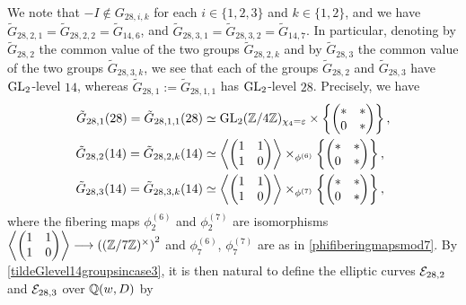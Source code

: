 We note that $-I \notin G_{28,i,k}$ for each $i \in \{1, 2, 3 \}$ and $k \in \{ 1, 2 \}$, and we have $\tilde{G}_{28,2,1} = \tilde{G}_{28,2,2} = \tilde{G}_{14,6}$, and $\tilde{G}_{28,3,1} = \tilde{G}_{28,3,2} = \tilde{G}_{14,7}$. In particular, denoting by $\tilde{G}_{28,2}$ the common value of the two groups $\tilde{G}_{28,2,k}$ and by $\tilde{G}_{28,3}$ the common value of the two groups $\tilde{G}_{28,3,k}$, we see that each of the groups $\tilde{G}_{28,2}$ and $\tilde{G}_{28,3}$ have $\operatorname{GL}_2$-level $14$, whereas $\tilde{G}_{28,1} := \tilde{G}_{28,1,1}$ has $\operatorname{GL}_2$-level $28$. Precisely, we have
\begin{equation} \label{unfiberedlevel28groups}
\begin{split}
\tilde{G}_{28,1}(28) = \tilde{G}_{28,1,1}(28) &\simeq \operatorname{GL}_2(\mathbb{Z}/4\mathbb{Z})_{\chi_4 = \varepsilon} \times \left\{ \begin{pmatrix} * & * \\ 0 & * \end{pmatrix} \right\}, \\
\tilde{G}_{28,2}(14) = \tilde{G}_{28,2,k}(14) &\simeq \left\langle \begin{pmatrix} 1 & 1 \\ 1 & 0 \end{pmatrix} \right\rangle \times_{\phi^{(6)}} \left\{ \begin{pmatrix} * & * \\ 0 & * \end{pmatrix} \right\}, \\
\tilde{G}_{28,3}(14) = \tilde{G}_{28,3,k}(14) &\simeq \left\langle \begin{pmatrix} 1 & 1 \\ 1 & 0 \end{pmatrix} \right\rangle \times_{\phi^{(7)}} \left\{ \begin{pmatrix} * & * \\ 0 & * \end{pmatrix} \right\},
\end{split}
\end{equation}
where the fibering maps $\phi_2^{(6)}$ and $\phi_2^{(7)}$ are isomorphisms $\left\langle \begin{pmatrix} 1 & 1 \\ 1 & 0 \end{pmatrix} \right\rangle \longrightarrow \left( (\mathbb{Z}/7\mathbb{Z})^\times \right)^2$ and $\phi_7^{(6)}$, $\phi_7^{(7)}$ are as in \eqref{phifiberingmapsmod7}. By \eqref{tildeGlevel14groupsincase3}, it is then natural to define the elliptic curves $\mathcal{E}_{28,2}$ and $\mathcal{E}_{28,3}$ over $\mathbb{Q}(w,D)$ by
